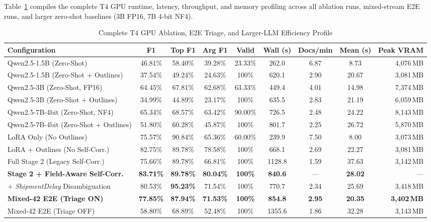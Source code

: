 \documentclass[11pt,a4paper]{article}
\begin{document}
Table~\ref{tab:t4_ablation_larger} compiles the complete T4 GPU runtime, latency, throughput, and memory profiling across all ablation runs, mixed-stream E2E runs, and larger zero-shot baselines (3B FP16, 7B 4-bit NF4).

\begin{table}[htbp]
\centering
\caption{Complete T4 GPU Ablation, E2E Triage, and Larger-LLM Efficiency Profile}
\label{tab:t4_ablation_larger}
\scriptsize
\setlength{\tabcolsep}{3.2pt}
\begin{tabular}{@{}l c c c c c c c r@{}}
\toprule
\textbf{Configuration} & \textbf{F1} & \textbf{Top F1} & \textbf{Arg F1} & \textbf{Valid} & \textbf{Wall (s)} & \textbf{Docs/min} & \textbf{Mean (s)} & \textbf{Peak VRAM} \\
\midrule
Qwen2.5-1.5B (Zero-Shot) & 46.81\% & 58.40\% & 39.28\% & 23.33\% & 262.0 & 6.87 & 8.73 & 4,076\,MB \\
Qwen2.5-1.5B (Zero-Shot + Outlines) & 37.54\% & 49.24\% & 24.63\% & 100\% & 620.1 & 2.90 & 20.67 & 3,081\,MB \\
Qwen2.5-3B (Zero-Shot, FP16) & 64.45\% & 67.81\% & 62.68\% & 63.33\% & 449.4 & 4.01 & 14.98 & 7,374\,MB \\
Qwen2.5-3B (Zero-Shot + Outlines) & 34.99\% & 44.89\% & 23.17\% & 100\% & 635.5 & 2.83 & 21.19 & 6,059\,MB \\
Qwen2.5-7B-4bit (Zero-Shot, NF4) & 65.34\% & 68.57\% & 63.42\% & 90.00\% & 726.5 & 2.48 & 24.22 & 8,143\,MB \\
Qwen2.5-7B-4bit (Zero-Shot + Outlines) & 51.80\% & 60.28\% & 45.87\% & 100\% & 801.7 & 2.25 & 26.72 & 5,870\,MB \\ \midrule
LoRA Only (No Outlines) & 75.57\% & 90.84\% & 65.36\% & 60.00\% & 239.9 & 7.50 & 8.00 & 3,073\,MB \\
LoRA + Outlines (No Self-Corr.) & 82.75\% & 89.78\% & 78.58\% & 100\% & 668.1 & 2.69 & 22.27 & 3,081\,MB \\
Full Stage 2 (Legacy Self-Corr.) & 75.66\% & 89.78\% & 66.81\% & 100\% & 1128.8 & 1.59 & 37.63 & 3,142\,MB \\
\textbf{Stage 2 + Field-Aware Self-Corr.} & \textbf{83.71\%} & \textbf{89.78\%} & \textbf{80.04\%} & \textbf{100\%} & \textbf{840.6} & --- & \textbf{28.02} & --- \\
\quad + \emph{ShipmentDelay} Disambiguation & 80.53\% & \textbf{95.23\%} & 71.54\% & 100\% & 770.7 & 2.34 & 25.69 & 3,418\,MB \\ \midrule
\textbf{Mixed-42 E2E (Triage ON)} & \textbf{77.85\%} & \textbf{87.94\%} & \textbf{71.53\%} & \textbf{100\%} & \textbf{854.8} & \textbf{2.95} & \textbf{20.35} & \textbf{3,402\,MB} \\
Mixed-42 E2E (Triage OFF) & 58.80\% & 68.89\% & 52.48\% & 100\% & 1355.6 & 1.86 & 32.28 & 3,143\,MB \\
\bottomrule
\end{tabular}
\end{table}
\end{document}
